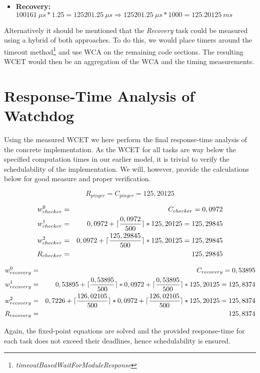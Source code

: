 \begin{itemize}
    \item \textbf{Recovery:} $100161\ \mu s * 1.25 = 125201.25\ \mu s \Rightarrow 125201.25\ \mu s * 1000 = 125.20125\ ms$
\end{itemize}

Alternatively it should be mentioned that the \textit{Recovery} task could be measured using a hybrid of both approaches. To do this, we would place timers around the timeout method\footnote{\textit{timeoutBasedWaitForModuleResponse}} and use WCA on the remaining code sections. The resulting WCET would then be an aggregation of the WCA and the timing measurements. 

\section{Response-Time Analysis of Watchdog} %
\label{sec:response_time_analysis_of_watchdog}
Using the measured WCET we here perform the final response-time analysis of the concrete implementation. As the WCET for all tasks are way below the specified computation times in our earlier model, it is trivial to verify the schedulability of the implementation. We will, however, provide the calculations below for good measure and proper verification.

\begin{equation}
\label{eq:pingerrta}
     R_{pinger} = C_{pinger} = 125,20125
\end{equation}

\begin{eqnarray}
    w_{checker}^0 &=& C_{checker} = 0,0972 \nonumber \\ 
    w_{checker}^1 &=& 0,0972 + \lceil\frac{0,0972}{500}\rceil*125,20125 = 125,29845 \nonumber \\ 
    w_{checker}^2 &=& 0,0972 + \lceil\frac{125,29845}{500}\rceil*125,20125 = 125,29845 \nonumber \\
    R_{checker} &=& 125,29845
\end{eqnarray}

\begin{eqnarray}
    w_{recovery}^0 &=& C_{recovery} = 0,53895 \nonumber \\ 
    w_{recovery}^1 &=& 0,53895 + \lceil\frac{0,53895}{500}\rceil*0,0972 + \lceil\frac{0,53895}{500}\rceil*125,20125 = 125,8374 \nonumber \\ 
    w_{recovery}^2 &=& 0,7226 + \lceil\frac{126,02105}{500}\rceil*0,0972 + \lceil\frac{126,02105}{500}\rceil*125,20125 = 125,8374 \nonumber \\
    R_{recovery} &=& 125,8374
\end{eqnarray}

Again, the fixed-point equations are solved and the provided response-time for each task does not exceed their deadlines, hence schedulability is ensured.


